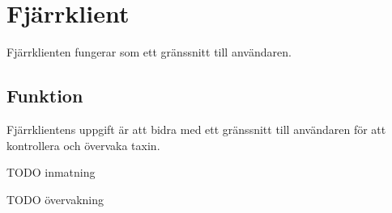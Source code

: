 \documentclass[designspec/spec.tex]{subfiles}
\begin{document}
\section{Fjärrklient}
Fjärrklienten fungerar som ett gränssnitt till användaren.

\subsection{Funktion}
Fjärrklientens uppgift är att bidra med ett gränssnitt till användaren för att
kontrollera och övervaka taxin.

TODO inmatning

TODO övervakning
\end{document}
